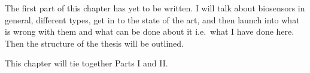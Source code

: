 The first part of this chapter has yet to be written.  I will talk about
biosensors in general, different types, get in to the state of the art, and
then launch into what is wrong with them and what can be done about it
i.e.\ what I have done here. Then the structure of the thesis will be
outlined.

This chapter will tie together Parts I and II.\@


%
%
%
%
%
%
%
